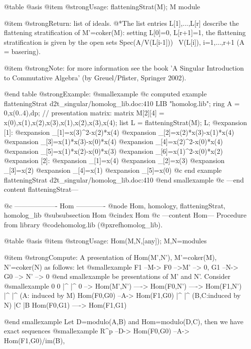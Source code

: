 @table @asis
@item @strong{Usage:}
flatteningStrat(M); M module

@item @strong{Return:}
list of ideals.
@*The list entries L[1],...,L[r] describe the flattening stratification
of M'=coker(M): setting L[0]=0, L[r+1]=1, the flattening
stratification is given by the open sets Spec(A/V(L[i-1])) \ V(L[i]),
i=1,...,r+1 (A = basering).

@item @strong{Note:}
for more information see the book 'A Singular Introduction to
Commutative Algebra' (by Greuel/Pfister, Springer 2002).

@end table
@strong{Example:}
@smallexample
@c computed example flatteningStrat d2t_singular/homolog_lib.doc:410 
LIB "homolog.lib";
ring A = 0,x(0..4),dp;
// presentation matrix:
matrix M[2][4] = x(0),x(1),x(2),x(3),x(1),x(2),x(3),x(4);
list L = flatteningStrat(M);
L;
@expansion{} [1]:
@expansion{}    _[1]=x(3)^2-x(2)*x(4)
@expansion{}    _[2]=x(2)*x(3)-x(1)*x(4)
@expansion{}    _[3]=x(1)*x(3)-x(0)*x(4)
@expansion{}    _[4]=x(2)^2-x(0)*x(4)
@expansion{}    _[5]=x(1)*x(2)-x(0)*x(3)
@expansion{}    _[6]=x(1)^2-x(0)*x(2)
@expansion{} [2]:
@expansion{}    _[1]=x(4)
@expansion{}    _[2]=x(3)
@expansion{}    _[3]=x(2)
@expansion{}    _[4]=x(1)
@expansion{}    _[5]=x(0)
@c end example flatteningStrat d2t_singular/homolog_lib.doc:410
@end smallexample
@c ---end content flatteningStrat---

@c ------------------- Hom -------------
@node Hom, homology, flatteningStrat, homolog_lib
@subsubsection Hom
@cindex Hom
@c ---content Hom---
Procedure from library @code{homolog.lib} (@pxref{homolog_lib}).

@table @asis
@item @strong{Usage:}
Hom(M,N,[any]); M,N=modules

@item @strong{Compute:}
A presentation of Hom(M',N'), M'=coker(M), N'=coker(N) as follows:
let
@smallexample
   F1 --M-> F0 -->M' --> 0,    G1 --N-> G0 --> N' --> 0  
@end smallexample
be presentations of M' and N'. Consider
@smallexample
                                  0               0
                                  |^              |^
       0 --> Hom(M',N') ----> Hom(F0,N') ----> Hom(F1,N')
                                  |^              |^
  (A:  induced by M)          Hom(F0,G0) --A-> Hom(F1,G0)
                                  |^              |^
  (B,C:induced by N)              |C              |B
                              Hom(F0,G1) ----> Hom(F1,G1)

@end smallexample
Let D=modulo(A,B) and Hom=modulo(D,C), then we have exact sequences
@smallexample
   R^p  --D-> Hom(F0,G0) --A-> Hom(F1,G0)/im(B),

